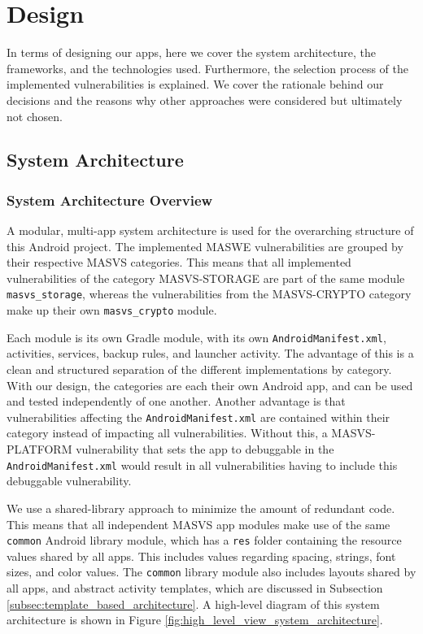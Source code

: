 \chapter{Design}
\label{c:design}

In terms of designing our apps, here we cover the system architecture, the frameworks, and the technologies used. Furthermore, the selection process of the implemented vulnerabilities is explained. We cover the rationale behind our decisions and the reasons why other approaches were considered but ultimately not chosen.

\section{System Architecture}

\subsection{System Architecture Overview}

A modular, multi-app system architecture is used for the overarching structure of this Android project. The implemented MASWE vulnerabilities are grouped by their respective MASVS categories. This means that all implemented vulnerabilities of the category MASVS-STORAGE are part of the same module \texttt{masvs\_storage}, whereas the vulnerabilities from the MASVS-CRYPTO category make up their own \texttt{masvs\_crypto} module. 

Each module is its own Gradle module, with its own \texttt{AndroidManifest.xml}, activities, services, backup rules, and launcher activity. The advantage of this is a clean and structured separation of the different implementations by category. With our design, the categories are each their own Android app, and can be used and tested independently of one another. Another advantage is that vulnerabilities affecting the \texttt{AndroidManifest.xml} are contained within their category instead of impacting all vulnerabilities. Without this, a MASVS-PLATFORM vulnerability that sets the app to debuggable in the \texttt{AndroidManifest.xml} would result in all vulnerabilities having to include this debuggable vulnerability.

We use a shared-library approach to minimize the amount of redundant code. This means that all independent MASVS app modules make use of the same \texttt{common} Android library module, which has a \texttt{res} folder containing the resource values shared by all apps. This includes values regarding spacing, strings, font sizes, and color values. The \texttt{common} library module also includes layouts shared by all apps, and abstract activity templates, which are discussed in Subsection \ref{subsec:template_based_architecture}. A high-level diagram of this system architecture is shown in Figure \ref{fig:high_level_view_system_architecture}.


